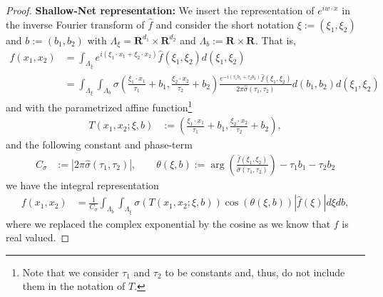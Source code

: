 \documentclass[a4paper]{article}
\newcommand{\rr}[1]{\mathbf{R}^{#1}}
\newcommand{\rrI}{\rr{d_1}}
\newcommand{\rrII}{\rr{d_2}}
\newcommand{\rrIxII}{\rrI\times\rrII}
\newcommand{\abs}[1]{| #1|}     %
\numberwithin{equation}{section}
\theoremstyle{remark}
\begin{document}
\begin{proof}
    \textbf{Shallow-Net representation:}
    We insert the representation of $e^{iw\cdot x}$ in the inverse Fourier transform of $\hat{f}$
    and consider the short notation 
    $\xi:=(\xi_1,\xi_2)$ and $b:=(b_1,b_2)$ with $\Lambda_\xi=\rrIxII$ and $\Lambda_b:=\rr{}\times\rr{}$.
    That is,
    \begin{align*}
        f(x_1,x_2)
        &=\int_{\Lambda_\xi}e^{i(\xi_1\cdot x_1+\xi_2\cdot x_2)}\hat{f}(\xi_1,\xi_2)d (\xi_1,\xi_2)\\
        &=
        \int_{\Lambda_\xi}\int_{\Lambda_b}\sigma\left(\frac{\xi_1\cdot x_1}{\tau_1}+b_1,\frac{\xi_2\cdot x_2}{\tau_2}+b_2\right)
        \frac{
            e^{-i(\tau_1b_1
                 +\tau_2b_2)}
            \hat{f}(\xi_1,\xi_2)
        }{
            2\pi\hat{\sigma}(\tau_1,\tau_2)
        }
        d (b_1,b_2) d (\xi_1,\xi_2)
    \end{align*}
    and with the parametrized affine function\footnote{Note that we consider $\tau_1$ and $\tau_2$ to be constants and, thus, do not include them in the notation of $T$.}
    \begin{align}\label{eq:affine_input}
        T\left(x_1,x_2;\xi,b\right)
        &:=\left(\frac{\xi_1\cdot x_1}{\tau_1}+b_1,\frac{\xi_2\cdot x_2}{\tau_2}+b_2\right),
    \end{align}
    and the following constant and phase-term
    \begin{align*}
        C_{\sigma}&:=\abs{2\pi\hat{\sigma}(\tau_1,\tau_2)},\qquad
        \theta(\xi,b):=
            \arg\left(
                \frac{
                    \hat{f}(\xi_1,\xi_2)
                }{
                    \hat{\sigma}(\tau_1,\tau_2)
                }
            \right)
            -\tau_1b_1-\tau_2b_2
    \end{align*}
    we have the integral representation
    \begin{align*}
        f(x_1,x_2)
        &=
        \frac{1}{C_\sigma}\int_{\Lambda_b}\int_{\Lambda_\xi}\sigma\left(T\left(x_1,x_2;\xi,b\right)\right)
        \cos\left(\theta(\xi,b)\right)
        \abs{\hat{f}(\xi)}
        d \xi d b,
    \end{align*}
    where we replaced the complex exponential by the cosine as
    we know that $f$ is real valued.
    

\end{proof}
\end{document}
